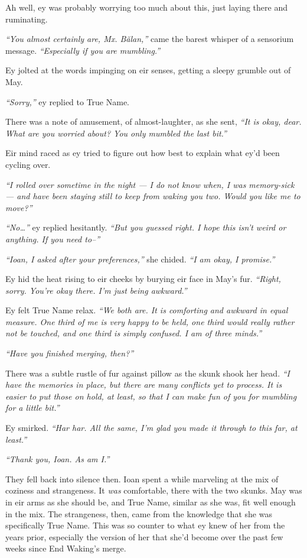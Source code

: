 Ah well, ey was probably worrying too much about this, just laying there and ruminating.

\emph{``You almost certainly are, Mx. Bălan,''} came the barest whisper of a sensorium message. \emph{``Especially if you are mumbling.''}

Ey jolted at the words impinging on eir senses, getting a sleepy grumble out of May.

\emph{``Sorry,''} ey replied to True Name.

There was a note of amusement, of almost-laughter, as she sent, \emph{``It is okay, dear. What are you worried about? You only mumbled the last bit.''}

Eir mind raced as ey tried to figure out how best to explain what ey'd been cycling over.

\emph{``I rolled over sometime in the night — I do not know when, I was memory-sick — and have been staying still to keep from waking you two. Would you like me to move?''}

\emph{``No\ldots{}''} ey replied hesitantly. \emph{``But you guessed right. I hope this isn't weird or anything. If you need to--''}

\emph{``Ioan, I asked after your preferences,''} she chided. \emph{``I am okay, I promise.''}

Ey hid the heat rising to eir cheeks by burying eir face in May's fur. \emph{``Right, sorry. You're okay there. I'm just being awkward.''}

Ey felt True Name relax. \emph{``We both are. It is comforting and awkward in equal measure. One third of me is very happy to be held, one third would really rather not be touched, and one third is simply confused. I am of three minds.''}

\emph{``Have you finished merging, then?''}

There was a subtle rustle of fur against pillow as the skunk shook her head. \emph{``I have the memories in place, but there are many conflicts yet to process. It is easier to put those on hold, at least, so that I can make fun of you for mumbling for a little bit.''}

Ey smirked. \emph{``Har har. All the same, I'm glad you made it through to this far, at least.''}

\emph{``Thank you, Ioan. As am I.''}

They fell back into silence then. Ioan spent a while marveling at the mix of coziness and strangeness. It \emph{was} comfortable, there with the two skunks. May was in eir arms as she should be, and True Name, similar as she was, fit well enough in the mix. The strangeness, then, came from the knowledge that she was specifically True Name. This was so counter to what ey knew of her from the years prior, especially the version of her that she'd become over the past few weeks since End Waking's merge.


